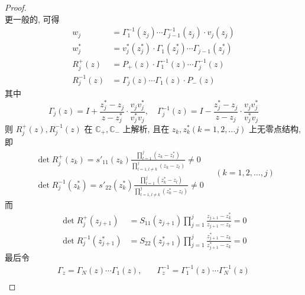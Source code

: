 \begin{proof}
\begin{equation}
  \end{equation}
  更一般的, 可得 
  \begin{equation}
    \begin{aligned}
      w_{j} &= \Gamma_{1}^{-1}(z_{j}) \cdots \Gamma_{j-1}^{-1}(z_{j}) \cdot v_{j}(z_{j}) \\
      w_{j}^{*} &= v_{j}^{*}(z_{j}^{*}) \cdot \Gamma_{1}(z_{j}^{*}) \cdots \Gamma_{j-1}(z_{j}^{*}) \\
      R_{j}^{+}(z) &= P_{+}(z) \cdot \Gamma_{1}^{-1}(z) \cdots \Gamma_{j}^{-1}(z) \\
      R_{j}^{-1}(z) &= \Gamma_{j}(z) \cdots \Gamma_{1}(z) \cdot P_{-}(z)
    \end{aligned}
  \end{equation}
  其中 
  \begin{equation}
    \Gamma_{j}(z) = I + \frac{z_{j}^{*} - z_{j}}{z - z_{j}^{*}} \cdot \frac{v_{j}v_{j}^{*}}{v_{j}^{*}v_{j}}, \quad \Gamma_{j}^{-1}(z) = I - \frac{z_{j}^{*} - z_{j}}{z - z_{j}} \cdot \frac{v_{j}v_{j}^{*}}{v_{j}^{*}v_{j}} \label{eq:Gamma-j}
  \end{equation}
  则 $ R_{j}^{+}(z), R_{j}^{-1}(z) $ 在 $ \mathbb{C_{+}}, \mathbb{C_{-}} $ 上解析, 且在 $ z_{k}, z_{k}^{*} (k = 1,2, \ldots j) $ 上无零点结构, 即
  \begin{equation}
    \begin{aligned}
      \det R_{j}^{+}(z_{k}) = s'_{11}(z_{k}) \frac{\prod_{l = 1}^{j}(z_{k} - z_{l}^{*})}{\prod_{l = 1, l \neq k }^{j}(z_{k} - z_{l})} \neq 0 \\
      \det R_{j}^{-1}(z_{k}^{*}) = s'_{22}(z_{k}^{*}) \frac{\prod_{l = 1}^{j}(z_{k}^{*} - z_{l})}{\prod_{l = 1, l \neq k }^{j}(z_{k}^{*} - z_{l})} \neq 0
    \end{aligned}  \quad (k = 1, 2, \dots, j)
  \end{equation}
  而
  \begin{equation}
    \begin{aligned}
      \det R_{j}^{+}(z_{j+1}) &= S_{11}(z_{j+1}) \prod_{j = 1}^{j} \frac{z_{j+1} - z_{k}^{*}}{z_{j+1} - z_{k}} = 0 \\
      \det R_{j}^{-1}(z_{j+1}^{*}) &= S_{22}(z_{j+1}^{*}) \prod_{j = 1}^{j} \frac{z_{j+1}^{*} - z_{k}}{z_{j+1}^{*} - z_{k}} = 0
    \end{aligned}
  \end{equation}
  最后令 
  \begin{equation}
    \begin{aligned}
      \Gamma_{z} = \Gamma_{N}(z) \cdots \Gamma_{1}(z),& \quad \Gamma_{z}^{-1} = \Gamma_{1}^{-1}(z) \cdots \Gamma_{N}^{-1}(z) \label{eq:Gamma-composition} \\ 

\end{aligned}
\end{equation}
\end{proof}
